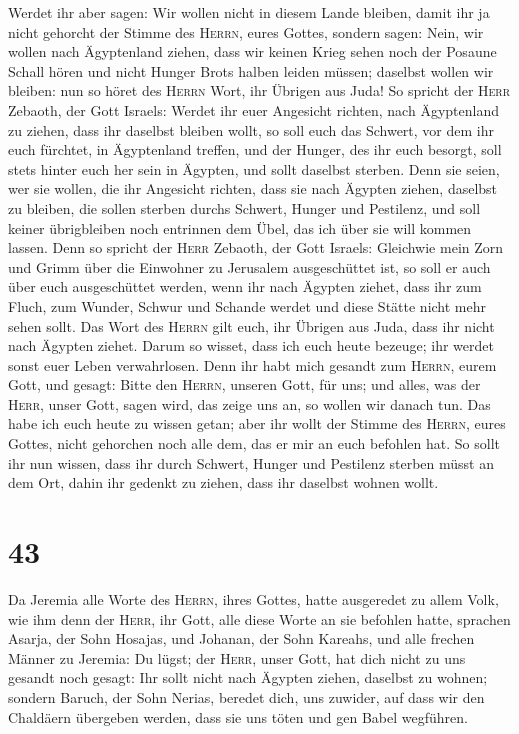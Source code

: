  Werdet ihr aber sagen: Wir wollen nicht in diesem Lande
bleiben, damit ihr ja nicht gehorcht der Stimme des \textsc{Herrn},
eures Gottes,  sondern sagen: Nein, wir wollen nach
Ägyptenland ziehen, dass wir keinen Krieg sehen noch der Posaune Schall
hören und nicht Hunger Brots halben leiden müssen; daselbst wollen wir
bleiben:  nun so höret des \textsc{Herrn} Wort, ihr
Übrigen aus Juda! So spricht der \textsc{Herr} Zebaoth, der Gott
Israels: Werdet ihr euer Angesicht richten, nach Ägyptenland zu ziehen,
dass ihr daselbst bleiben wollt,  so soll euch das
Schwert, vor dem ihr euch fürchtet, in Ägyptenland treffen, und der
Hunger, des ihr euch besorgt, soll stets hinter euch her sein in
Ägypten, und sollt daselbst sterben.  Denn sie seien, wer
sie wollen, die ihr Angesicht richten, dass sie nach Ägypten ziehen,
daselbst zu bleiben, die sollen sterben durchs Schwert, Hunger und
Pestilenz, und soll keiner übrigbleiben noch entrinnen dem Übel, das ich
über sie will kommen lassen.  Denn so spricht der
\textsc{Herr} Zebaoth, der Gott Israels: Gleichwie mein Zorn und Grimm
über die Einwohner zu Jerusalem ausgeschüttet ist, so soll er auch über
euch ausgeschüttet werden, wenn ihr nach Ägypten ziehet, dass ihr zum
Fluch, zum Wunder, Schwur und Schande werdet und diese Stätte nicht mehr
sehen sollt.  Das Wort des \textsc{Herrn} gilt euch, ihr
Übrigen aus Juda, dass ihr nicht nach Ägypten ziehet. Darum so wisset,
dass ich euch heute bezeuge;  ihr werdet sonst euer Leben
verwahrlosen. Denn ihr habt mich gesandt zum \textsc{Herrn}, eurem Gott,
und gesagt: Bitte den \textsc{Herrn}, unseren Gott, für uns; und alles,
was der \textsc{Herr}, unser Gott, sagen wird, das zeige uns an, so
wollen wir danach tun.  Das habe ich euch heute zu wissen
getan; aber ihr wollt der Stimme des \textsc{Herrn}, eures Gottes, nicht
gehorchen noch alle dem, das er mir an euch befohlen hat.
 So sollt ihr nun wissen, dass ihr durch Schwert, Hunger
und Pestilenz sterben müsst an dem Ort, dahin ihr gedenkt zu ziehen,
dass ihr daselbst wohnen wollt.

\hypertarget{section-42}{%
\section{43}\label{section-42}}

 Da Jeremia alle Worte des \textsc{Herrn}, ihres Gottes,
hatte ausgeredet zu allem Volk, wie ihm denn der \textsc{Herr}, ihr
Gott, alle diese Worte an sie befohlen hatte,  sprachen
Asarja, der Sohn Hosajas, und Johanan, der Sohn Kareahs, und alle
frechen Männer zu Jeremia: Du lügst; der \textsc{Herr}, unser Gott, hat
dich nicht zu uns gesandt noch gesagt: Ihr sollt nicht nach Ägypten
ziehen, daselbst zu wohnen;  sondern Baruch, der Sohn
Nerias, beredet dich, uns zuwider, auf dass wir den Chaldäern übergeben
werden, dass sie uns töten und gen Babel wegführen.


